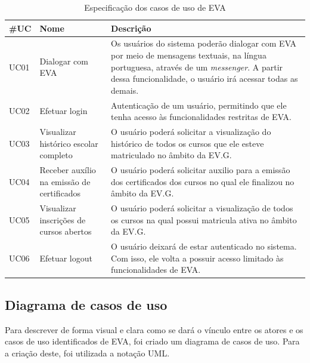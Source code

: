 \begin{table}[htb!]
\caption{Especificação dos casos de uso de EVA}
\label{tabela:tabela4}
\center
\footnotesize
\begin{tabular}{|p{2cm}|p{3cm}|p{7.5cm}|}
  \hline
   \textbf{\#UC} & \textbf{Nome}  & \textbf{Descrição}  \\
   \hline
    UC01 & Dialogar com EVA & Os usuários do sistema poderão dialogar com EVA por meio de mensagens textuais, na língua portuguesa, através de um \textit{messenger}. A partir dessa funcionalidade, o usuário irá acessar todas as demais.\\
   \hline
    UC02 & Efetuar login & Autenticação de um usuário, permitindo que ele tenha acesso às funcionalidades restritas de EVA. \\
   \hline
    UC03 & Visualizar histórico escolar completo & O usuário poderá solicitar a visualização do histórico de todos os cursos que ele esteve matriculado no âmbito da EV.G. \\
   \hline
    UC04 & Receber auxílio na emissão de certificados & O usuário poderá solicitar auxilio para a emissão dos certificados dos cursos no qual ele finalizou no âmbito da EV.G. \\
   \hline
    UC05 & Visualizar inscrições de cursos abertos & O usuário poderá solicitar a visualização de todos os cursos na qual possui matricula ativa no âmbito da EV.G. \\
   \hline
    UC06 & Efetuar logout & O usuário deixará de estar autenticado no sistema. Com isso, ele volta a possuir acesso limitado às funcionalidades de EVA.\\
   \hline
\end{tabular}
\end{table}

\subsection{Diagrama de casos de uso}

Para descrever de forma visual e clara como se dará o vínculo entre os atores e os casos de uso identificados de EVA, foi criado um diagrama de casos de uso. Para a criação deste, foi utilizada a notação UML.

